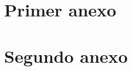 \chapter{Primer anexo}
\label{ch:anexo-a}

\blindtext[5]


\chapter{Segundo anexo}
\label{ch:anexo-b}


\blindtext[10]



